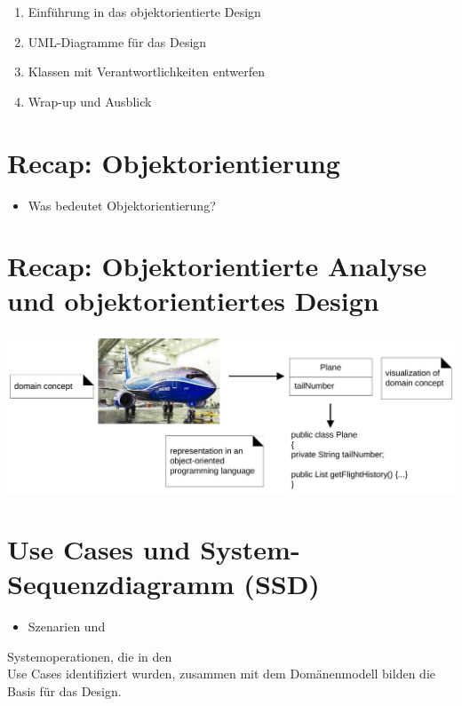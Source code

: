 \documentclass[10pt]{article}
\begin{document}
\begin{enumerate}
  \item Einführung in das objektorientierte Design
  \item UML-Diagramme für das Design
  \item Klassen mit Verantwortlichkeiten entwerfen
  \item Wrap-up und Ausblick
\end{enumerate}

\section*{Recap: Objektorientierung}
\begin{itemize}
  \item Was bedeutet Objektorientierung?
\end{itemize}

\section*{Recap: Objektorientierte Analyse und objektorientiertes Design}
\begin{center}
\includegraphics[width=\linewidth]{images/2025_01_02_787afb9584031d2940deg-06}
\end{center}

\section*{Use Cases und System-Sequenzdiagramm (SSD)}
\begin{itemize}
  \item Szenarien und
\end{itemize}

Systemoperationen, die in den\\
Use Cases identifiziert wurden, zusammen mit dem Domänenmodell bilden die Basis für das Design.
\end{document}
